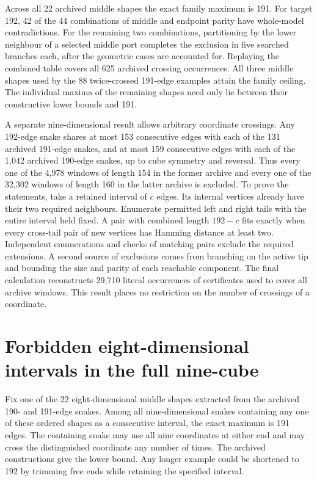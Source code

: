 \documentclass[11pt,a4paper]{article}
\theoremstyle{definition}
\theoremstyle{remark}
\begin{document}
Across all 22 archived middle shapes the exact family maximum is 191. For target 192, 42 of the 44 combinations of middle and endpoint parity have whole-model contradictions. For the remaining two combinations, partitioning by the lower neighbour of a selected middle port completes the exclusion in five searched branches each, after the geometric cases are accounted for. Replaying the combined table covers all 625 archived crossing occurrences. All three middle shapes used by the 88 twice-crossed 191-edge examples attain the family ceiling. The individual maxima of the remaining shapes need only lie between their constructive lower bounds and 191.

A separate nine-dimensional result allows arbitrary coordinate crossings. Any 192-edge snake shares at most 153 consecutive edges with each of the 131 archived 191-edge snakes, and at most 159 consecutive edges with each of the 1,042 archived 190-edge snakes, up to cube symmetry and reversal. Thus every one of the 4,978 windows of length 154 in the former archive and every one of the 32,302 windows of length 160 in the latter archive is excluded. To prove the statements, take a retained interval of \(c\) edges. Its internal vertices already have their two required neighbours. Enumerate permitted left and right tails with the entire interval held fixed. A pair with combined length \(192-c\) fits exactly when every cross-tail pair of new vertices has Hamming distance at least two. Independent enumerations and checks of matching pairs exclude the required extensions. A second source of exclusions comes from branching on the active tip and bounding the size and parity of each reachable component. The final calculation reconstructs 29,710 literal occurrences of certificates used to cover all archive windows. This result places no restriction on the number of crossings of a coordinate.

\section{Forbidden eight-dimensional intervals in the full nine-cube}\label{sec:forbidden-q8-intervals}
Fix one of the 22 eight-dimensional middle shapes extracted from the archived 190- and 191-edge snakes. Among all nine-dimensional snakes containing any one of these ordered shapes as a consecutive interval, the exact maximum is 191 edges. The containing snake may use all nine coordinates at either end and may cross the distinguished coordinate any number of times. The archived constructions give the lower bound. Any longer example could be shortened to 192 by trimming free ends while retaining the specified interval.
\end{document}
